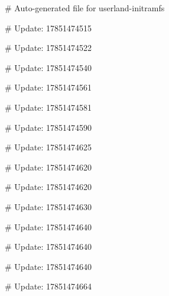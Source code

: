 # Auto-generated file for userland-initramfs

# Update: 17851474515

# Update: 17851474522

# Update: 17851474540

# Update: 17851474561

# Update: 17851474581

# Update: 17851474590

# Update: 17851474625

# Update: 17851474620

# Update: 17851474620

# Update: 17851474630

# Update: 17851474640

# Update: 17851474640

# Update: 17851474640

# Update: 17851474664
